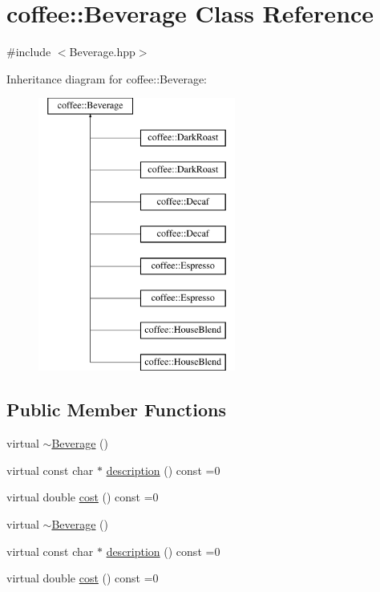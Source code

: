 \hypertarget{classcoffee_1_1Beverage}{\section{coffee\-:\-:Beverage Class Reference}
\label{classcoffee_1_1Beverage}
}


{\ttfamily \#include $<$Beverage.\-hpp$>$}

Inheritance diagram for coffee\-:\-:Beverage\-:\begin{figure}[H]
\begin{center}
\leavevmode
\includegraphics[height=9.000000cm]{classcoffee_1_1Beverage}
\end{center}
\end{figure}
\subsection*{Public Member Functions}
\begin{DoxyCompactItemize}
\item 
virtual \hyperlink{classcoffee_1_1Beverage_ad2f121f17244a54c6bfa5c867e25858a}{$\sim$\-Beverage} ()
\item 
virtual const char $\ast$ \hyperlink{classcoffee_1_1Beverage_adb1d5bf7b3d64448bb115bdc738e0d15}{description} () const =0
\item 
virtual double \hyperlink{classcoffee_1_1Beverage_ad412eac730de94b25dd5e3e5c5cb5d20}{cost} () const =0
\item 
virtual \hyperlink{classcoffee_1_1Beverage_a0a99e0388408b969d6cfe8dffef1a998}{$\sim$\-Beverage} ()
\item 
virtual const char $\ast$ \hyperlink{classcoffee_1_1Beverage_adb1d5bf7b3d64448bb115bdc738e0d15}{description} () const =0
\item 
virtual double \hyperlink{classcoffee_1_1Beverage_ad412eac730de94b25dd5e3e5c5cb5d20}{cost} () const =0
\end{DoxyCompactItemize}


